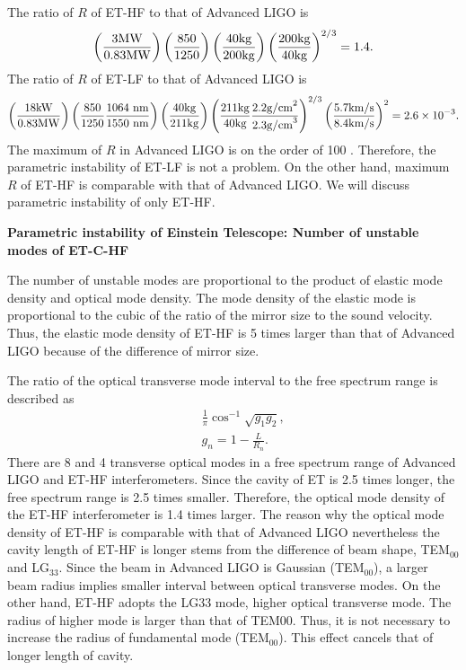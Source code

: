 The ratio of $R$ of ET-HF to that of Advanced LIGO is 
\begin{equation}
\left(\frac{3 {\rm MW}}{0.83 {\rm MW}}\right)\left(\frac{850}{1250}\right) \left(\frac{40 {\rm kg}}{200 {\rm kg}}\right) \left(\frac{200 {\rm kg}}{40 {\rm kg}}\right)^{2/3}=1.4.
\end{equation}
The ratio of $R$ of ET-LF to that of Advanced LIGO is 
\begin{equation}
\left(\frac{18 {\rm kW}}{0.83 {\rm MW}}\right)\left(\frac{850}{1250}\frac{1064~{\rm nm}}{1550~{\rm nm}}\right) \left(\frac{40 {\rm kg}}{211 {\rm kg}}\right) \left(\frac{211 {\rm kg}}{40 {\rm kg}}\frac{2.2 {\rm g/cm}^2}{2.3 {\rm g/cm}^3}\right)^{2/3} \left(\frac{5.7 {\rm km/s}}{8.4 {\rm km/s}}\right)^2=2.6\times10^{-3}. 
\end{equation}
The maximum of $R$ in Advanced LIGO is on the order of 100 \cite{Ju2006b}. Therefore, the parametric instability of ET-LF 
is not a problem. On the other hand, maximum $R$ of ET-HF is comparable with that of Advanced LIGO. We will discuss 
parametric instability of only ET-HF.

\textbf{Parametric instability of Einstein Telescope: Number of unstable modes of ET-C-HF}
\nopagebreak

The number of unstable modes are proportional to the product of elastic mode density and 
optical mode density.
The mode density of the elastic mode is proportional to the cubic
of the ratio of the mirror size to the sound velocity. Thus, 
the elastic mode density of ET-HF is 5 times larger than that of Advanced LIGO because
of the difference of mirror size. 

The ratio of the optical transverse mode interval to the free spectrum range is
described as
\begin{eqnarray}
&&\frac1{\pi}\cos^{-1}\sqrt{g_1 g_2},\\
&&g_n = 1-\frac{L}{R_n}.
\end{eqnarray}
There are 8 and 4 transverse optical modes in a free spectrum
range of Advanced LIGO and ET-HF interferometers. Since the cavity of ET is 2.5
times longer, the free spectrum range is 2.5 times smaller.
Therefore, the optical mode density of the ET-HF interferometer is 1.4 times larger.
The reason why the optical mode density of ET-HF is comparable with that of Advanced LIGO 
nevertheless the cavity length of ET-HF is longer stems from the difference of beam shape, 
TEM$_{00}$ and LG$_{33}$. Since the beam in Advanced LIGO is Gaussian (TEM$_{00}$), a larger beam radius 
implies smaller interval between optical transverse modes. On the other hand, ET-HF adopts 
the LG33 mode, higher optical transverse mode. The radius of higher mode is larger than that of TEM00. 
Thus, it is not necessary to increase the radius of fundamental mode (TEM$_{00}$). This effect cancels 
that of longer length of cavity. 
 
